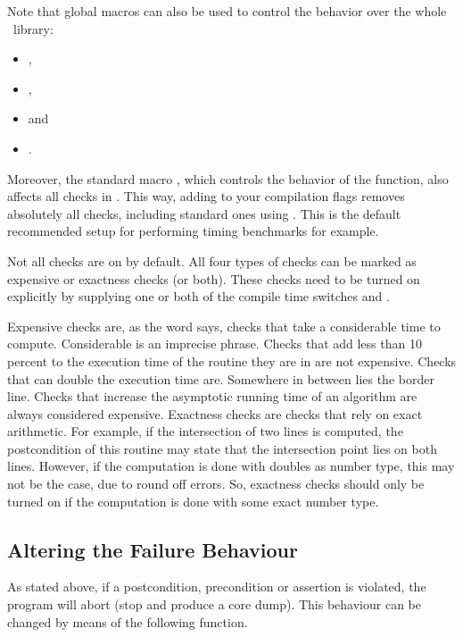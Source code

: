 Note that global macros can also be used to control the behavior over the
whole \cgal\ library:
\begin{itemize}
  \item {},
  \item {},
  \item {} and
  \item {}.
\end{itemize}

Moreover, the standard macro , which controls the behavior of
the  function, also affects all checks in \cgal.  This way,
adding  to your compilation flags removes absolutely all
checks, including standard ones using .  This is the default
recommended setup for performing timing benchmarks for example.

Not all checks are on by default.
All four types of checks can be marked as expensive or exactness checks
(or both).
These checks need to be turned on explicitly by supplying one or both of
the compile time switches  and 
.

Expensive checks are, as the word says, checks that take a considerable
time to compute. 
Considerable is an imprecise phrase. 
Checks that add less than 10 percent to the execution time of the routine 
they are in are not expensive.
Checks that can double the execution time are. 
Somewhere in between lies the border line.
Checks that increase the asymptotic running time of an algorithm are always 
considered expensive.
Exactness checks are checks that rely on exact arithmetic. 
For example, if the intersection of two lines is computed, the postcondition 
of this routine may state that the intersection point lies on both lines. 
However, if the computation is done with doubles as number type, this may not 
be the case, due to round off errors. 
So, exactness checks should only be turned on if the computation is done 
with some exact number type.

\subsection{Altering the Failure Behaviour}

As stated above, if a postcondition, precondition or assertion is
violated, the program will abort (stop and produce a core dump).
This behaviour can be changed by means of the following function.

